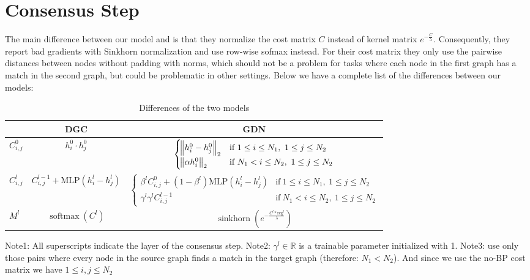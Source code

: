 \section{Consensus Step}
\label{appendix:consensus}

The main difference between our model and \cite{fey2020_update} is that they normalize the cost matrix $C$ instead of kernel matrix $e^{-\frac{C}{\lambda}}$. Consequently, they report bad gradients with Sinkhorn normalization and use row-wise sofmax instead. For their cost matrix they only use the pairwise distances between nodes without padding with norms, which should not be a problem for tasks where each node in the first graph has a match in the second graph, but could be problematic in other settings. Below we have a complete list of the differences between our models:


\begin{table}[htbp]
    \addtolength{\tabcolsep}{-1pt}
    \fontsize{9pt}{10.25pt}\selectfont
    \centering
    \renewcommand{\arraystretch}{1.2}
    \begin{tabular}{|C{1cm}|c|c|}
        \hline
        & DGC & GDN \\
        \hline
        $C^0_{i,j} $ & $h_i^0 \cdot h_j^0$ & $\begin{cases}
            \norm{h_i^0 - h_j^0}_2 & \text{if}\ 1 \leq i \leq N_1,\ 1 \leq j \leq N_2\\
            \norm{\alpha h_i^0}_2 & \text{if}\ N_1 < i \leq N_2,\ 1 \leq j \leq N_2
         \end{cases}$ \\
        $C^l_{i,j} $ & $C^{l - 1}_{i,j} + \text{MLP}(h_i^l - h_j^l)$ & $
        \begin{cases}
            \beta^l C^0_{i,j} + (1 - \beta^l) \text{MLP}(h_i^l - h_j^l) & \text{if}\ 1 \leq i \leq N_1,\ 1 \leq j \leq N_2\\
            \gamma^l \gamma^l C^{l - 1}_{i,j}  & \text{if}\ N_1 < i \leq N_2,\ 1 \leq j \leq N_2
        \end{cases}
        $ \\
        $M^l $ & $\operatorname{softmax}(C^l)$ & $\operatorname{sinkhorn}\left(e^{-\frac{C^l * \text{reg}^l}{\lambda}}\right)$ \\
        \hline
    \end{tabular}
    \caption{Differences of the two models}
    \label{tab:ex1-data}
\end{table}

Note1: All superscripts indicate the layer of the consensus step.
Note2: $\gamma^l \in \mathbb{R}$ is a trainable parameter initialized with 1.
Note3: \cite{fey2020_update} use only those pairs where every node in the source graph finds a match in the target graph (therefore: $N_1 < N_2$). And since we use the no-BP cost matrix we have $1 \leq i, j \leq N_2$

